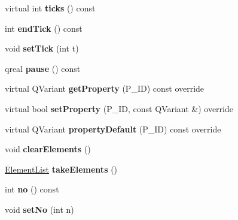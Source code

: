 \begin{DoxyCompactItemize}
virtual int {\bfseries ticks} () const
\item 
\mbox{\label{class_ms_1_1_measure_base_a988758eb10862ae22510379b80553127}} 
int {\bfseries end\+Tick} () const
\item 
\mbox{\label{class_ms_1_1_measure_base_a0c84ca13a2de4b614a9acf72111520ad}} 
void {\bfseries set\+Tick} (int t)
\item 
\mbox{\label{class_ms_1_1_measure_base_ad0194f300147b15b038039e21ffb75b2}} 
qreal {\bfseries pause} () const
\item 
\mbox{\label{class_ms_1_1_measure_base_ac8f6fce06cddbe8ecdabe71e290dd7ba}} 
virtual Q\+Variant {\bfseries get\+Property} (P\+\_\+\+ID) const override
\item 
\mbox{\label{class_ms_1_1_measure_base_a3f392aa3f4a0597653ce7c9487d788b5}} 
virtual bool {\bfseries set\+Property} (P\+\_\+\+ID, const Q\+Variant \&) override
\item 
\mbox{\label{class_ms_1_1_measure_base_a2bc0dcced23b6c6627e0a3fb790c4fad}} 
virtual Q\+Variant {\bfseries property\+Default} (P\+\_\+\+ID) const override
\item 
\mbox{\label{class_ms_1_1_measure_base_a46fb74eb56c0c0b056e8f7a759675ece}} 
void {\bfseries clear\+Elements} ()
\item 
\mbox{\label{class_ms_1_1_measure_base_ae4c2254a3440f2fb993cee717412fec5}} 
\hyperlink{class_ms_1_1_element_list}{Element\+List} {\bfseries take\+Elements} ()
\item 
\mbox{\label{class_ms_1_1_measure_base_ab0624346b77edaab4269b9eb2523a225}} 
int {\bfseries no} () const
\item 
\mbox{\label{class_ms_1_1_measure_base_a2aaffc490540f2744696b3ffda1fd66a}} 
void {\bfseries set\+No} (int n)
\item 
\mbox{\label{class_ms_1_1_measure_base_a29b7c1273c42ffbceaed3be455a8eff1}} 

\end{DoxyCompactItemize}

